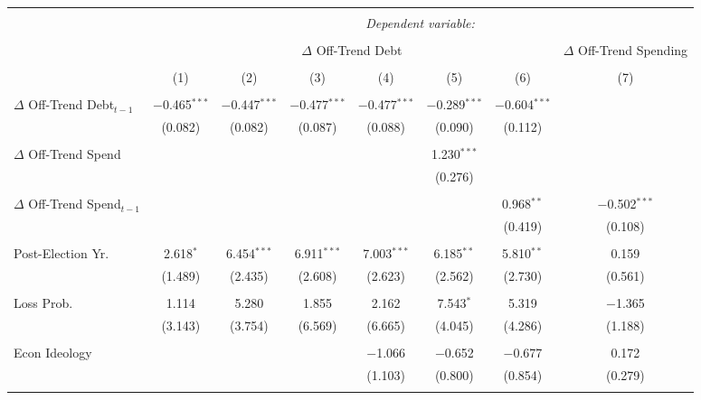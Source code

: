 
\begingroup 
\tiny 
\begin{tabular}{@{\extracolsep{5pt}}lccccccc} 
\\[-1.8ex]\hline 
\hline \\[-1.8ex] 
 & \multicolumn{7}{c}{\textit{Dependent variable:}} \\ 
\cline{2-8} 
\\[-1.8ex] & \multicolumn{6}{c}{$\Delta$ Off-Trend Debt} & $\Delta$ Off-Trend Spending \\ 
\\[-1.8ex] & (1) & (2) & (3) & (4) & (5) & (6) & (7)\\ 
\hline \\[-1.8ex] 
 $\Delta$ Off-Trend Debt$_{t-1}$ & $-$0.465$^{***}$ & $-$0.447$^{***}$ & $-$0.477$^{***}$ & $-$0.477$^{***}$ & $-$0.289$^{***}$ & $-$0.604$^{***}$ &  \\ 
  & (0.082) & (0.082) & (0.087) & (0.088) & (0.090) & (0.112) &  \\ 
  & & & & & & & \\ 
 $\Delta$ Off-Trend Spend &  &  &  &  & 1.230$^{***}$ &  &  \\ 
  &  &  &  &  & (0.276) &  &  \\ 
  & & & & & & & \\ 
 $\Delta$ Off-Trend Spend$_{t-1}$ &  &  &  &  &  & 0.968$^{**}$ & $-$0.502$^{***}$ \\ 
  &  &  &  &  &  & (0.419) & (0.108) \\ 
  & & & & & & & \\ 
 Post-Election Yr. & 2.618$^{*}$ & 6.454$^{***}$ & 6.911$^{***}$ & 7.003$^{***}$ & 6.185$^{**}$ & 5.810$^{**}$ & 0.159 \\ 
  & (1.489) & (2.435) & (2.608) & (2.623) & (2.562) & (2.730) & (0.561) \\ 
  & & & & & & & \\ 
 Loss Prob. & 1.114 & 5.280 & 1.855 & 2.162 & 7.543$^{*}$ & 5.319 & $-$1.365 \\ 
  & (3.143) & (3.754) & (6.569) & (6.665) & (4.045) & (4.286) & (1.188) \\ 
  & & & & & & & \\ 
 Econ Ideology &  &  &  & $-$1.066 & $-$0.652 & $-$0.677 & 0.172 \\ 
  &  &  &  & (1.103) & (0.800) & (0.854) & (0.279) \\ 
  & & & & & & & \\ 

\end{tabular}
